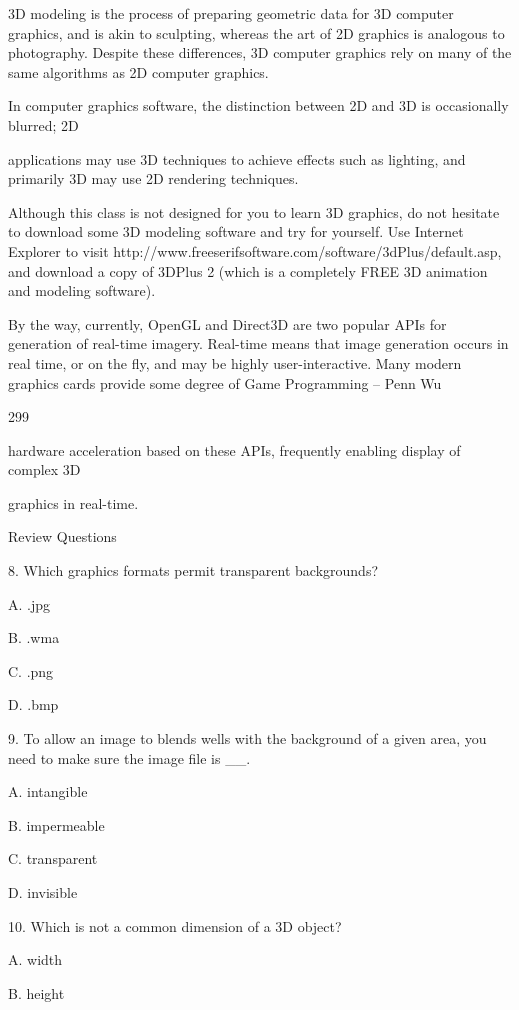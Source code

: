 \documentclass[
]{article}
\begin{document}
3D modeling is the process of preparing geometric data for 3D computer
graphics, and is akin to sculpting, whereas the art of 2D graphics is
analogous to photography. Despite these differences, 3D computer
graphics rely on many of the same algorithms as 2D computer graphics.

In computer graphics software, the distinction between 2D and 3D is
occasionally blurred; 2D

applications may use 3D techniques to achieve effects such as lighting,
and primarily 3D may use 2D rendering techniques.

Although this class is not designed for you to learn 3D graphics, do not
hesitate to download some 3D modeling software and try for yourself. Use
Internet Explorer to visit
http://www.freeserifsoftware.com/software/3dPlus/default.asp, and
download a copy of 3DPlus 2 (which is a completely FREE 3D animation and
modeling software).

By the way, currently, OpenGL and Direct3D are two popular APIs for
generation of real-time imagery. Real-time means that image generation
occurs in \textquotesingle real time\textquotesingle, or
\textquotesingle on the fly\textquotesingle, and may be highly
user-interactive. Many modern graphics cards provide some degree of Game
Programming -- Penn Wu

299

\protect\hypertarget{index_split_015.htmlux5cux23p300}{}{}hardware
acceleration based on these APIs, frequently enabling display of complex
3D

graphics in real-time.

Review Questions

8. Which graphics formats permit transparent backgrounds?

A. .jpg

B. .wma

C. .png

D. .bmp

9. To allow an image to blends wells with the background of a given
area, you need to make sure the image file is \_\_.

A. intangible

B. impermeable

C. transparent

D. invisible

10. Which is not a common dimension of a 3D object?

A. width

B. height
\end{document}
